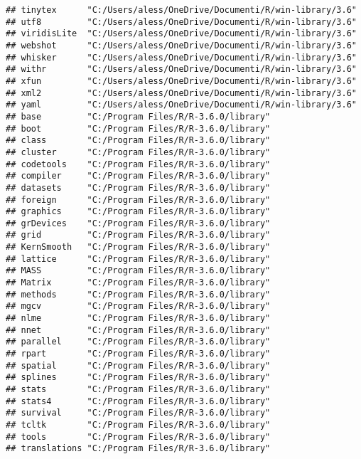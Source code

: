 \documentclass[]{article}
\begin{document}
\begin{verbatim}
## tinytex      "C:/Users/aless/OneDrive/Documenti/R/win-library/3.6"
## utf8         "C:/Users/aless/OneDrive/Documenti/R/win-library/3.6"
## viridisLite  "C:/Users/aless/OneDrive/Documenti/R/win-library/3.6"
## webshot      "C:/Users/aless/OneDrive/Documenti/R/win-library/3.6"
## whisker      "C:/Users/aless/OneDrive/Documenti/R/win-library/3.6"
## withr        "C:/Users/aless/OneDrive/Documenti/R/win-library/3.6"
## xfun         "C:/Users/aless/OneDrive/Documenti/R/win-library/3.6"
## xml2         "C:/Users/aless/OneDrive/Documenti/R/win-library/3.6"
## yaml         "C:/Users/aless/OneDrive/Documenti/R/win-library/3.6"
## base         "C:/Program Files/R/R-3.6.0/library"                 
## boot         "C:/Program Files/R/R-3.6.0/library"                 
## class        "C:/Program Files/R/R-3.6.0/library"                 
## cluster      "C:/Program Files/R/R-3.6.0/library"                 
## codetools    "C:/Program Files/R/R-3.6.0/library"                 
## compiler     "C:/Program Files/R/R-3.6.0/library"                 
## datasets     "C:/Program Files/R/R-3.6.0/library"                 
## foreign      "C:/Program Files/R/R-3.6.0/library"                 
## graphics     "C:/Program Files/R/R-3.6.0/library"                 
## grDevices    "C:/Program Files/R/R-3.6.0/library"                 
## grid         "C:/Program Files/R/R-3.6.0/library"                 
## KernSmooth   "C:/Program Files/R/R-3.6.0/library"                 
## lattice      "C:/Program Files/R/R-3.6.0/library"                 
## MASS         "C:/Program Files/R/R-3.6.0/library"                 
## Matrix       "C:/Program Files/R/R-3.6.0/library"                 
## methods      "C:/Program Files/R/R-3.6.0/library"                 
## mgcv         "C:/Program Files/R/R-3.6.0/library"                 
## nlme         "C:/Program Files/R/R-3.6.0/library"                 
## nnet         "C:/Program Files/R/R-3.6.0/library"                 
## parallel     "C:/Program Files/R/R-3.6.0/library"                 
## rpart        "C:/Program Files/R/R-3.6.0/library"                 
## spatial      "C:/Program Files/R/R-3.6.0/library"                 
## splines      "C:/Program Files/R/R-3.6.0/library"                 
## stats        "C:/Program Files/R/R-3.6.0/library"                 
## stats4       "C:/Program Files/R/R-3.6.0/library"                 
## survival     "C:/Program Files/R/R-3.6.0/library"                 
## tcltk        "C:/Program Files/R/R-3.6.0/library"                 
## tools        "C:/Program Files/R/R-3.6.0/library"                 
## translations "C:/Program Files/R/R-3.6.0/library"                 

\end{verbatim}
\end{document}
